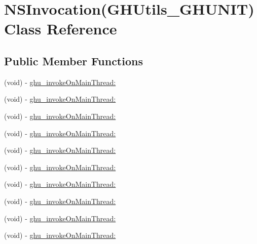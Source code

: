 \hypertarget{interface_n_s_invocation_07_g_h_utils___g_h_u_n_i_t_08}{
\section{\-N\-S\-Invocation(\-G\-H\-Utils\-\_\-\-G\-H\-U\-N\-I\-T) \-Class \-Reference}
\label{interface_n_s_invocation_07_g_h_utils___g_h_u_n_i_t_08}
}
\subsection*{\-Public \-Member \-Functions}
\begin{DoxyCompactItemize}
\item 
(void) -\/ \hyperlink{interface_n_s_invocation_07_g_h_utils___g_h_u_n_i_t_08_a669943acde2d3b4d5305090762c6dd65}{ghu\-\_\-invoke\-On\-Main\-Thread\-:}
\item 
(void) -\/ \hyperlink{interface_n_s_invocation_07_g_h_utils___g_h_u_n_i_t_08_a669943acde2d3b4d5305090762c6dd65}{ghu\-\_\-invoke\-On\-Main\-Thread\-:}
\item 
(void) -\/ \hyperlink{interface_n_s_invocation_07_g_h_utils___g_h_u_n_i_t_08_a669943acde2d3b4d5305090762c6dd65}{ghu\-\_\-invoke\-On\-Main\-Thread\-:}
\item 
(void) -\/ \hyperlink{interface_n_s_invocation_07_g_h_utils___g_h_u_n_i_t_08_a669943acde2d3b4d5305090762c6dd65}{ghu\-\_\-invoke\-On\-Main\-Thread\-:}
\item 
(void) -\/ \hyperlink{interface_n_s_invocation_07_g_h_utils___g_h_u_n_i_t_08_a669943acde2d3b4d5305090762c6dd65}{ghu\-\_\-invoke\-On\-Main\-Thread\-:}
\item 
(void) -\/ \hyperlink{interface_n_s_invocation_07_g_h_utils___g_h_u_n_i_t_08_a669943acde2d3b4d5305090762c6dd65}{ghu\-\_\-invoke\-On\-Main\-Thread\-:}
\item 
(void) -\/ \hyperlink{interface_n_s_invocation_07_g_h_utils___g_h_u_n_i_t_08_a669943acde2d3b4d5305090762c6dd65}{ghu\-\_\-invoke\-On\-Main\-Thread\-:}
\item 
(void) -\/ \hyperlink{interface_n_s_invocation_07_g_h_utils___g_h_u_n_i_t_08_a669943acde2d3b4d5305090762c6dd65}{ghu\-\_\-invoke\-On\-Main\-Thread\-:}
\item 
(void) -\/ \hyperlink{interface_n_s_invocation_07_g_h_utils___g_h_u_n_i_t_08_a669943acde2d3b4d5305090762c6dd65}{ghu\-\_\-invoke\-On\-Main\-Thread\-:}
\item 
(void) -\/ \hyperlink{interface_n_s_invocation_07_g_h_utils___g_h_u_n_i_t_08_a669943acde2d3b4d5305090762c6dd65}{ghu\-\_\-invoke\-On\-Main\-Thread\-:}
\end{DoxyCompactItemize}
